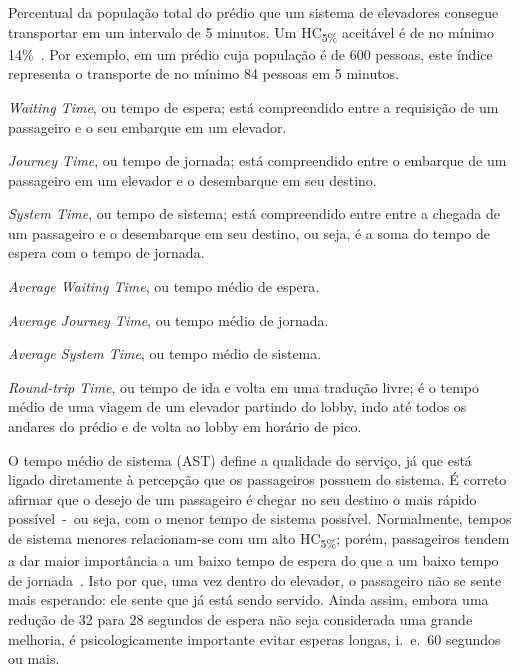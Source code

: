 \begin{description}[leftmargin=!,labelwidth=\widthof{\bfseries HC\textsubscript{5\%}}]
  \item[HC\textsubscript{5\%}]
  Percentual da população total do prédio que um sistema de elevadores consegue transportar em um intervalo de 5 minutos. Um HC\textsubscript{5\%} aceitável é de no mínimo 14\%~\cite{KOEHLEROTTIGER02}. Por exemplo, em um prédio cuja população é de 600 pessoas, este índice representa o transporte de no mínimo 84 pessoas em 5 minutos.

  \item[WT]
  \textit{Waiting Time}, ou tempo de espera; está compreendido entre a requisição de um passageiro e o seu embarque em um elevador.

  \item[JT]
  \textit{Journey Time}, ou tempo de jornada; está compreendido entre o embarque de um passageiro em um elevador e o desembarque em seu destino.

  \item[ST]
  \textit{System Time}, ou tempo de sistema; está compreendido entre entre a chegada de um passageiro e o desembarque em seu destino, ou seja, é a soma do tempo de espera com o tempo de jornada.

  \item[AWT]
  \textit{Average Waiting Time}, ou tempo médio de espera.

  \item[AJT]
  \textit{Average Journey Time}, ou tempo médio de jornada.

  \item[AST]
  \textit{Average System Time}, ou tempo médio de sistema.

  \item[RTT]
  \textit{Round-trip Time}, ou tempo de ida e volta em uma tradução livre; é o tempo médio de uma viagem de um elevador partindo do lobby, indo até todos os andares do prédio e de volta ao lobby em horário de pico.
\end{description}

O tempo médio de sistema (AST) define a qualidade do serviço, já que está ligado diretamente à percepção que os passageiros possuem do sistema. É correto afirmar que o desejo de um passageiro é chegar no seu destino o mais rápido possível~-~ou seja, com o menor tempo de sistema possível. Normalmente, tempos de sistema menores relacionam-se com um alto HC\textsubscript{5\%}; porém, passageiros tendem a dar maior importância a um baixo tempo de espera do que a um baixo tempo de jornada~\cite{KOEHLEROTTIGER02}. Isto por que, uma vez dentro do elevador, o passageiro não se sente mais esperando: ele sente que já está sendo servido. Ainda assim, embora uma redução de 32 para 28 segundos de espera não seja considerada uma grande melhoria, é psicologicamente importante evitar esperas longas, i.~e.~60 segundos ou mais.

